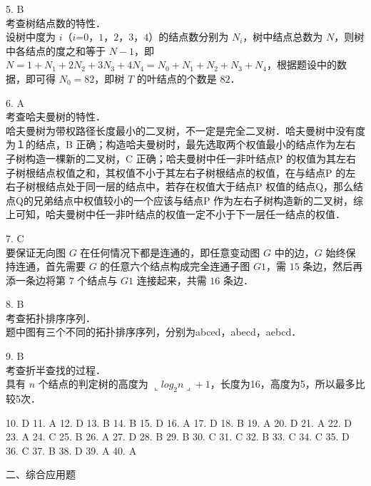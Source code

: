 5. B \\
考查树结点数的特性． \\
设树中度为 $i$（$i$=$0$，$1$，$2$，$3$，$4$）的结点数分别为 $N_i$，树中结点总数为 $N$，则树中各结点的度之和等于 $N-1$，即 $N=1+N_1+2N_2+3N_3+4N_4=N_0+N_1+N_2+N_3+N_4$，根据题设中的数据，即可得 $N_0=82$，即树 $T$ 的叶结点的个数是 $82$．

6. A \\
考查哈夫曼树的特性． \\
哈夫曼树为带权路径长度最小的二叉树，不一定是完全二叉树．哈夫曼树中没有度为１的结点，B 正确；构造哈夫曼树时，最先选取两个权值最小的结点作为左右子树构造一棵新的二叉树，C 正确；哈夫曼树中任一非叶结点P 的权值为其左右子树根结点权值之和，其权值不小于其左右子树根结点的权值，在与结点P 的左右子树根结点处于同一层的结点中，若存在权值大于结点P 权值的结点Q，那么结点Q的兄弟结点中权值较小的一个应该与结点P 作为左右子树构造新的二叉树，综上可知，哈夫曼树中任一非叶结点的权值一定不小于下一层任一结点的权值．

7. C \\
要保证无向图 $G$ 在任何情况下都是连通的，即任意变动图 $G$ 中的边，$G$ 始终保持连通，首先需要 $G$ 的任意六个结点构成完全连通子图 $G1$，需 $15$ 条边，然后再添一条边将第 $7$ 个结点与 $G1$ 连接起来，共需 $16$ 条边．

8. B \\
考查拓扑排序序列． \\
题中图有三个不同的拓扑排序序列，分别为abced，abecd，aebcd．

9. B \\
考查折半查找的过程． \\
具有 $n$ 个结点的判定树的高度为 $\llcorner log_2n\lrcorner+1$，长度为16，高度为5，所以最多比较5次．

10. D 11. A 12. D 13. B 14. B 15. D 16. A
17. D 18. B 19. A 20. D 21. A 22. D 23. A 24. C
25. B 26. A 27. D 28. B 29. B 30. C 31. C 32. B
33. C 34. C 35. D 36. C 37. B 38. D 39. A 40. A

二、综合应用题

